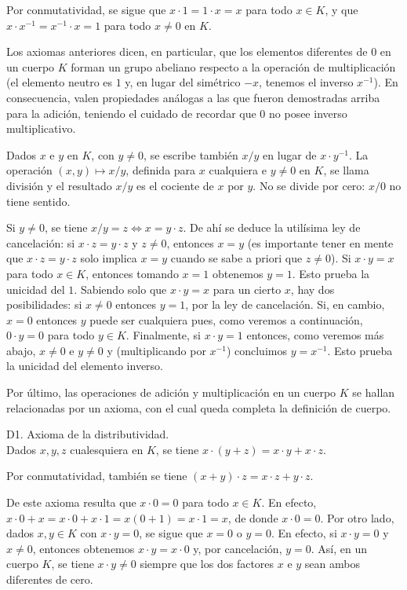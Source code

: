 \documentclass[12pt,oneside]{book}
\begin{document}
Por conmutatividad, se sigue que \(x \cdot 1 = 1 \cdot x = x\) para todo \(x \in K\), y que \(x \cdot x^{-1} = x^{-1} \cdot x = 1\) para todo \(x \neq 0\) en \(K\).

Los axiomas anteriores dicen, en particular, que los elementos diferentes de \(0\) en un cuerpo \(K\) forman un grupo abeliano respecto a la operación de multiplicación (el elemento neutro es \(1\) y, en lugar del simétrico \(-x\), tenemos el inverso \(x^{-1}\)). En consecuencia, valen propiedades análogas a las que fueron demostradas arriba para la adición, teniendo el cuidado de recordar que \(0\) no posee inverso multiplicativo.

Dados \(x\) e \(y\) en \(K\), con \(y \neq 0\), se escribe también \(x/y\) en lugar de \(x \cdot y^{-1}\). La operación \((x,y) \mapsto x/y\), definida para \(x\) cualquiera e \(y \neq 0\) en \(K\), se llama división y el resultado \(x/y\) es el cociente de \(x\) por \(y\). No se divide por cero: \(x/0\) no tiene sentido.

Si \(y \neq 0\), se tiene \(x/y = z \Leftrightarrow x = y \cdot z\). De ahí se deduce la utilísima ley de cancelación: si \(x \cdot z = y \cdot z\) y \(z \neq 0\), entonces \(x = y\) (es importante tener en mente que \(x \cdot z = y \cdot z\) solo implica \(x = y\) cuando se sabe a priori que \(z \neq 0\)). Si \(x \cdot y = x\) para todo \(x \in K\), entonces tomando \(x = 1\) obtenemos \(y = 1\). Esto prueba la unicidad del \(1\). Sabiendo solo que \(x \cdot y = x\) para un cierto \(x\), hay dos posibilidades: si \(x \neq 0\) entonces \(y = 1\), por la ley de cancelación. Si, en cambio, \(x = 0\) entonces \(y\) puede ser cualquiera pues, como veremos a continuación, \(0 \cdot y = 0\) para todo \(y \in K\). Finalmente, si \(x \cdot y = 1\) entonces, como veremos más abajo, \(x \neq 0\) e \(y \neq 0\) y (multiplicando por \(x^{-1}\)) concluimos \(y = x^{-1}\). Esto prueba la unicidad del elemento inverso.

Por último, las operaciones de adición y multiplicación en un cuerpo \(K\) se hallan relacionadas por un axioma, con el cual queda completa la definición de cuerpo.

D1. Axioma de la distributividad.\\
Dados \(x, y, z\) cualesquiera en \(K\), se tiene \(x \cdot (y + z) = x \cdot y + x \cdot z\).

Por conmutatividad, también se tiene \((x+y) \cdot z = x \cdot z + y \cdot z\).

De este axioma resulta que \(x \cdot 0 = 0\) para todo \(x \in K\). En efecto, \(x \cdot 0 + x = x \cdot 0 + x \cdot 1 = x(0+1) = x \cdot 1 = x\), de donde \(x \cdot 0 = 0\). Por otro lado, dados \(x, y \in K\) con \(x \cdot y = 0\), se sigue que \(x = 0\) o \(y = 0\). En efecto, si \(x \cdot y = 0\) y \(x \neq 0\), entonces obtenemos \(x \cdot y = x \cdot 0\) y, por cancelación, \(y = 0\). Así, en un cuerpo \(K\), se tiene \(x \cdot y \neq 0\) siempre que los dos factores \(x\) e \(y\) sean ambos diferentes de cero.
\end{document}
